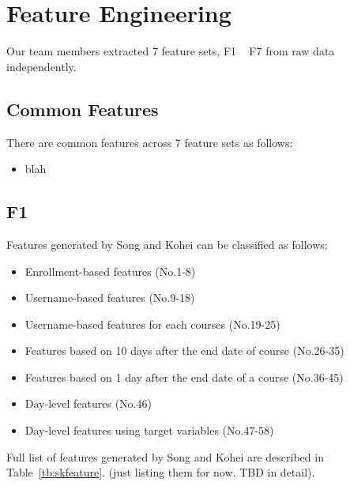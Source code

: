 \section{Feature Engineering}
Our team members extracted 7 feature sets, F1 ~ F7 from raw data independently.
 
\subsection{Common Features}
There are common features across 7 feature sets as follows:
\begin{itemize}
	\item blah
\end{itemize}

\subsection{F1}

Features generated by Song and Kohei can be classified as follows:

\begin{itemize}
  \setlength\itemsep{0em}
  \item Enrollment-based features (No.1-8)
  \item Username-based features (No.9-18)
  \item Username-based features for each courses (No.19-25) 
  \item Features based on 10 days after the end date of course (No.26-35)
  \item Features based on 1 day after the end date of a course (No.36-45)
  \item Day-level features (No.46)
  \item Day-level features using target variables (No.47-58)
\end{itemize}

Full list of features generated by Song and Kohei are described in Table~\ref{tb:skfeature}.
(just listing them for now. TBD in detail).

